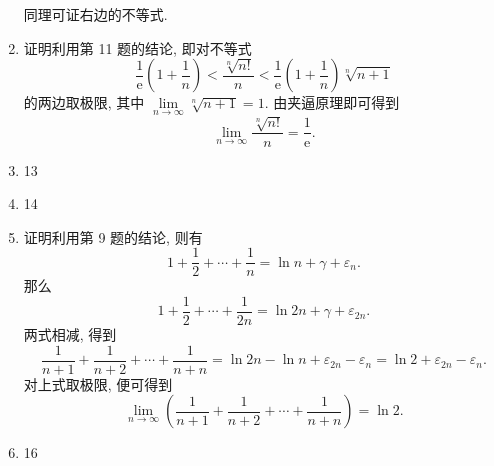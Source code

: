 \begin{enumerate}
        同理可证右边的不等式.
    \item {\heiti 证明}\quad 利用第 11 题的结论, 即对不等式
        \[
            \frac{1}{\mathrm{e}}\left(1 + \frac1n\right) < \frac{\sqrt[n]{n!}}{n} < \frac{1}{\mathrm{e}}\left(1 + \frac1n\right)\sqrt[n]{n+1}  
        \]
        的两边取极限, 其中 $\lim\limits_{n\to\infty}\sqrt[n]{n+1} = 1$. 由夹逼原理即可得到
        \[
            \lim\limits_{n\to\infty}\frac{\sqrt[n]{n!}}{n} = \frac{1}{\mathrm{e}}.    
        \]
    \item 13
    \item 14
    \item %
        {\heiti 证明}\quad 利用第 9 题的结论, 则有
        \[
            1 + \frac12 + \cdots + \frac1n = \ln n + \gamma + \varepsilon_n.    
        \]
        那么
        \[
            1 + \frac12 + \cdots + \frac{1}{2n} = \ln 2n + \gamma + \varepsilon_{2n}.    
        \]
        两式相减, 得到
        \[
            \frac{1}{n+1} + \frac{1}{n+2} + \cdots + \frac{1}{n + n} = \ln 2n - \ln n + \varepsilon_{2n} - \varepsilon_n = \ln2 + \varepsilon_{2n} - \varepsilon_n.     
        \]
        对上式取极限, 便可得到
        \[
            \lim_{n\to\infty} \left(\frac{1}{n+1} + \frac{1}{n+2} + \cdots + \frac{1}{n+n}\right) = \ln2.    
        \]
    \item 16
\end{enumerate}
% 
